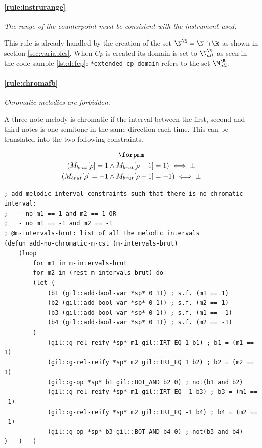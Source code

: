 \paragraph{\ref{rule:instrurange}} \textit{The range of the counterpoint must be consistent with the instrument used.}

This rule is already handled by the creation of the set $\N^{\R} = \N \cap \R$ as shown in section \ref{sec:variables}. When $Cp$ is created its domain is set to $\N_{all}^{\R}$ as seen in the code sample \ref{lst:defcp}: \texttt{*extended-cp-domain} refers to the set $\N_{all}^{\R}$.

\paragraph{\ref{rule:chromafb}} \textit{Chromatic melodies are forbidden.}

A three-note melody is chromatic if the interval between the first, second and third notes is one semitone in the same direction each time. This can be translated into the two following constraints.

\begin{equation}
    \begin{gathered}
        \forpmm\\
        (M_{brut}[\rho] = 1 \land M_{brut}[\rho+1] = 1) \iff \bot\\
        (M_{brut}[\rho] = -1 \land M_{brut}[\rho+1] = -1) \iff \bot\\
    \end{gathered}
\end{equation}

\begin{lstlisting}[caption=Function that prevents chromatic melodies., label=lst:chromafb-cst]
; add melodic interval constraints such that there is no chromatic interval:
;   - no m1 == 1 and m2 == 1 OR
;   - no m1 == -1 and m2 == -1
; @m-intervals-brut: list of all the melodic intervals
(defun add-no-chromatic-m-cst (m-intervals-brut)
    (loop
        for m1 in m-intervals-brut
        for m2 in (rest m-intervals-brut) do
        (let (
            (b1 (gil::add-bool-var *sp* 0 1)) ; s.f. (m1 == 1)
            (b2 (gil::add-bool-var *sp* 0 1)) ; s.f. (m2 == 1)
            (b3 (gil::add-bool-var *sp* 0 1)) ; s.f. (m1 == -1)
            (b4 (gil::add-bool-var *sp* 0 1)) ; s.f. (m2 == -1)
        )
            (gil::g-rel-reify *sp* m1 gil::IRT_EQ 1 b1) ; b1 = (m1 == 1)
            (gil::g-rel-reify *sp* m2 gil::IRT_EQ 1 b2) ; b2 = (m2 == 1)
            (gil::g-op *sp* b1 gil::BOT_AND b2 0) ; not(b1 and b2)
            (gil::g-rel-reify *sp* m1 gil::IRT_EQ -1 b3) ; b3 = (m1 == -1)
            (gil::g-rel-reify *sp* m2 gil::IRT_EQ -1 b4) ; b4 = (m2 == -1)
            (gil::g-op *sp* b3 gil::BOT_AND b4 0) ; not(b3 and b4)
)   )   )
\end{lstlisting}

